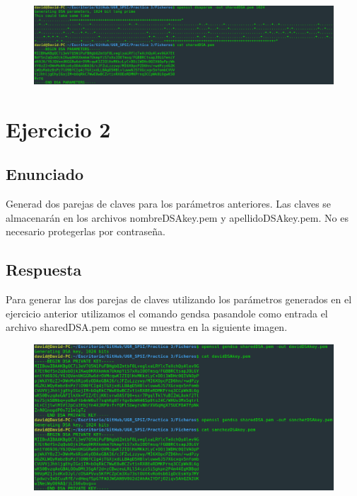 \documentclass[10pt,a4paper,spanish]{report}
\begin{document}
\begin{figure}[!hbp]
 \centering  \includegraphics[width=1\textwidth]{./Imagenes/1.png}
\end{figure}


\chapter{Ejercicio 2}

\section{Enunciado}
\noindent
Generad dos parejas de claves para los parámetros anteriores. Las claves se almacenarán en los archivos nombreDSAkey.pem y apellidoDSAkey.pem. No es necesario protegerlas por contraseña.

\section{Respuesta}
\noindent
Para generar las dos parejas de claves utilizando los parámetros generados en el ejercicio anterior utilizamos el comando gendsa pasandole como entrada el archivo sharedDSA.pem como se muestra en la siguiente imagen.

\begin{figure}[!hbp]
 \centering  \includegraphics[width=1\textwidth]{./Imagenes/2.png}
\end{figure}
\end{document}
